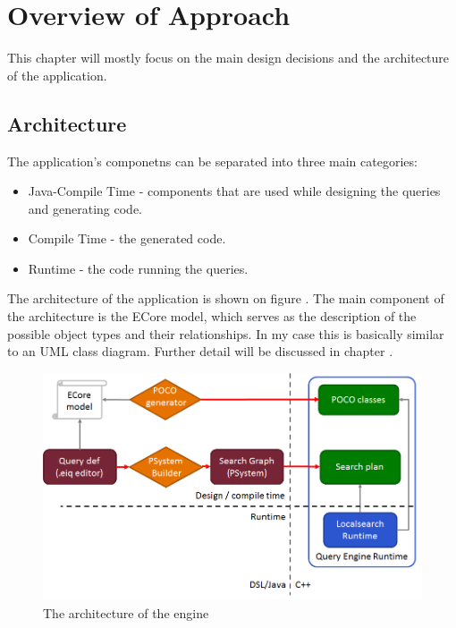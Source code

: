 \chapter{Overview of Approach}

This chapter will mostly focus on the main design decisions and the architecture
of the application.

\section{Architecture}\label{sec:Architecture}

The application's componetns can be separated into three main categories:

\begin{itemize}
  \item Java-Compile Time - components that are used while designing the
  queries and generating code.
  \item \CPP{} Compile Time - the generated code.
  \item \CPP{} Runtime - the code running the queries.
\end{itemize}

The architecture of the application is shown on figure .
The main component of the architecture is the ECore model, which serves as
the description of the possible object types and their relationships.
In my case this is basically similar to an UML class diagram. Further
detail will be discussed in chapter .

\begin{figure}[!ht]
\centering
\includegraphics[width=150mm, keepaspectratio]{figures/architecture.png}
\caption{The architecture of the engine}
\label{fig:architecture}
\end{figure}


